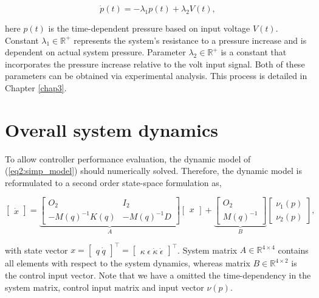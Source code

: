 \begin{equation}
    \dot{p}(t) = -\lambda_1 p(t) + \lambda_2 V(t),
\end{equation}

here $p(t)$ is the time-dependent pressure based on input voltage $V(t)$. Constant $\lambda_1 \in \mathbb{R}^+$ represents the system's resistance to a pressure increase and is dependent on actual system pressure. Parameter $\lambda_2 \in \mathbb{R}^+$ is a constant that incorporates the pressure increase relative to the volt input signal. Both of these parameters can be obtained via experimental analysis. This process is detailed in Chapter \ref{chap3}.



\section{Overall system dynamics}

To allow controller performance evaluation, the dynamic model of (\ref{eq2:simp_model}) should numerically solved. Therefore, the dynamic model is reformulated to a second order state-space formulation as,

\begin{equation}
     \begin{bmatrix} \dot{x}  \end{bmatrix}   = \underbrace{  \begin{bmatrix} O_2 & I_2 \\ -M(q)^{-1}K(q)  & -M(q)^{-1} D \end{bmatrix}   }_{A} \begin{bmatrix} x \end{bmatrix}  +      \underbrace{\begin{bmatrix} O_2 \\ M(q)^{-1}   \end{bmatrix}   }_{B}    \begin{bmatrix} \nu_1(p) \\ \nu_2(p)  
     \end{bmatrix}, 
     \label{eq4:SS}
\end{equation}

with state vector $x = \begin{bmatrix} q \hspace{3pt} \dot{q}   \end{bmatrix}^\top =  \begin{bmatrix} \kappa \hspace{3pt} \epsilon \hspace{3pt} \dot{\kappa}  \hspace{3pt} \dot{\epsilon}  \end{bmatrix}^{\top}$. System matrix $A \in \mathbb{R}^{4\times 4}$ contains all elements with respect to the system dynamics, whereas matrix $B\in\mathbb{R}^{4 \times 2}$ is the control input vector. Note that we have a omitted the time-dependency in the system matrix, control input matrix and input vector $\nu(p)$. 

